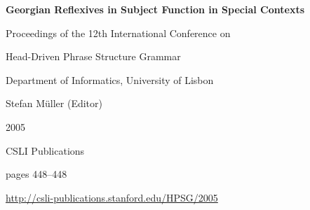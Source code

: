 \documentclass[a4paper,11pt]{article}
\begin{document}
\begin{center}
  {\huge\bf Georgian Reflexives in Subject Function in Special Contexts\par}

  \bigskip

  {\LARGE  \par}

  \vspace*{3\bigskipamount}

  Proceedings of the 12th International Conference on\par Head-Driven Phrase Structure Grammar

  \bigskip

  Department of Informatics, University of Lisbon

  \medskip

  Stefan Müller (Editor)

  \medskip

  2005

  \medskip

  CSLI Publications

  \medskip

  pages 448--448

  \medskip

  \url{http://csli-publications.stanford.edu/HPSG/2005}
\end{center}

\newpage

        
\end{document}
